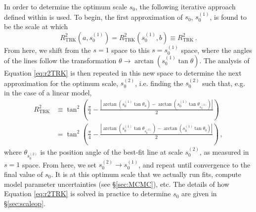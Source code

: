\label{par:scaleopscheme}In order to determine the optimum scale $s_0$, the following iterative approach defined within \textcite{trotter} is used. To begin, the first approximation of $s_0$, $s_0^{(1)}$, is found to be the scale at which
\begin{equation}\label{eq:r2TRK}
R^{2}_{\mathrm{TRK}}(a,s_0^{(1)}) = R^{2}_{\mathrm{TRK}}(s_0^{(1)},b) \equiv R^2_{\mathrm{TRK}} \, .
\end{equation}
From here, we shift from the $s=1$ space to this $s=s_0^{(1)}$ space, where the angles of the lines follow the transformation $\theta\rightarrow \arctan\left(s_0^{(1)}\tan\theta\right)$. The analysis of Equation \eqref{eq:r2TRK} is then repeated in this new space to determine the next approximation for the optimum scale, $s_0^{(2)}$, i.e. finding the $s_0^{(2)}$ such that,
e.g. in the case of a linear model,
\begin{align}\label{eq:r2TRKnewscalelin}
R^2_{\mathrm{TRK}} & \equiv \tan^2\left(\frac{\pi}{4}-\frac{\left|\arctan (s_0^{(1)}\tan\theta_a)-\arctan (s_0^{(1)}\tan\theta_{s_0^{(2)}})\right|}{2}\right) \nonumber \\
& =
\tan^2\left(\frac{\pi}{4}-\frac{\left|\arctan (s_0^{(1)}\tan\theta_{s_0^{(2)}})-\arctan (s_0^{(1)}\tan\theta_b)\right|}{2}\right) \, ,
\end{align}
where $\theta_{s_0^{(2)}}$ is the position angle of the best-fit line at scale $s_0^{(2)}$, as measured in $s=1$ space. From here, we set $s_0^{(2)}\rightarrow s_0^{(1)}$, and repeat until convergence to the final value of $s_0$. It is at this optimum scale that we actually run fits, compute model parameter uncertainties (see \S\ref{sec:MCMC}), etc. The details of how Equation \eqref{eq:r2TRK} is solved in practice to determine $s_0$ are given in \S\ref{sec:scaleop}.

